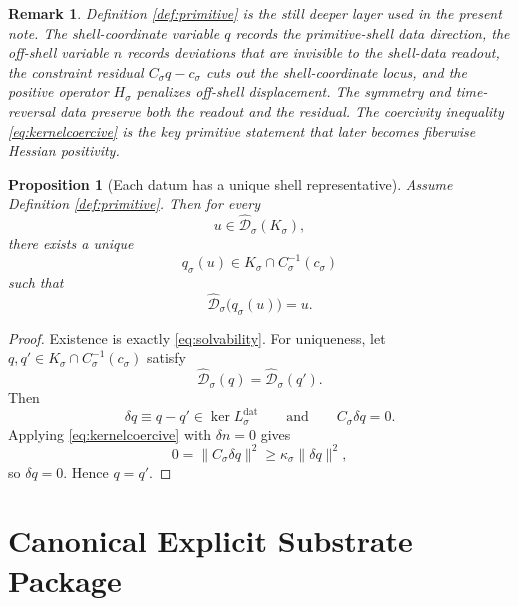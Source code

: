 \documentclass[11pt]{article}
\newcommand{\CoordBody}[1]{K_{#1}}
\newcommand{\AffineData}[1]{\widehat{\mathcal D}_{#1}}
\newcommand{\ConstraintMap}[1]{C_{#1}}
\newcommand{\ConstraintValue}[1]{c_{#1}}
\newcommand{\NormalOperator}[1]{H_{#1}}
\newcommand{\LinearData}[1]{L_{#1}^{\mathrm{dat}}}
\newtheorem{proposition}{Proposition}
\newtheorem{remark}{Remark}
\begin{document}
\begin{remark}
Definition \ref{def:primitive} is the still deeper layer used in the present note. The shell-coordinate variable \(q\) records the primitive-shell data direction, the off-shell variable \(n\) records deviations that are invisible to the shell-data readout, the constraint residual \(\ConstraintMap{\sigma}q-\ConstraintValue{\sigma}\) cuts out the shell-coordinate locus, and the positive operator \(\NormalOperator{\sigma}\) penalizes off-shell displacement. The symmetry and time-reversal data preserve both the readout and the residual. The coercivity inequality \eqref{eq:kernelcoercive} is the key primitive statement that later becomes fiberwise Hessian positivity.
\end{remark}

\begin{proposition}[Each datum has a unique shell representative]
\label{prop:uniqueshell}
Assume Definition \ref{def:primitive}. Then for every
\[
u\in \AffineData{\sigma}(\CoordBody{\sigma}),
\]
there exists a unique
\[
q_{\sigma}(u)\in \CoordBody{\sigma}\cap \ConstraintMap{\sigma}^{-1}(\ConstraintValue{\sigma})
\]
such that
\[
\AffineData{\sigma}\bigl(q_{\sigma}(u)\bigr)=u.
\]
\end{proposition}

\begin{proof}
Existence is exactly \eqref{eq:solvability}. For uniqueness, let \(q,q'\in\CoordBody{\sigma}\cap \ConstraintMap{\sigma}^{-1}(\ConstraintValue{\sigma})\) satisfy
\[
\AffineData{\sigma}(q)=\AffineData{\sigma}(q').
\]
Then
\[
\delta q\equiv q-q'\in\ker\LinearData{\sigma}
\qquad\text{and}\qquad
\ConstraintMap{\sigma}\delta q=0.
\]
Applying \eqref{eq:kernelcoercive} with \(\delta n=0\) gives
\[
0
=
\|\ConstraintMap{\sigma}\delta q\|^{2}
\ge
\kappa_{\sigma}\|\delta q\|^{2},
\]
so \(\delta q=0\). Hence \(q=q'\).
\end{proof}

\section{Canonical Explicit Substrate Package}
\end{document}
